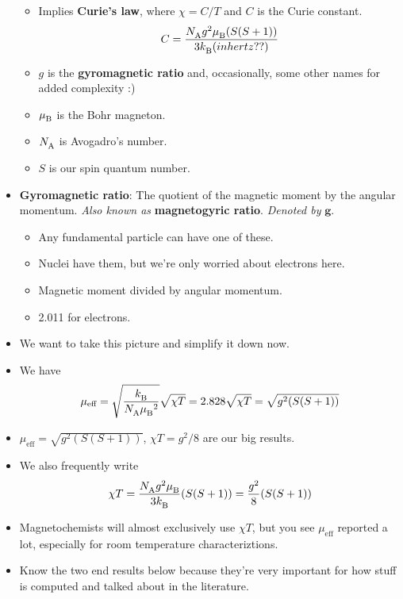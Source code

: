 \documentclass[../notes.tex]{subfiles}
\begin{document}
\begin{itemize}
\begin{itemize}
        \item Implies \textbf{Curie's law}, where $\chi=C/T$ and $C$ is the Curie constant.
        \begin{equation*}
            C = \frac{{N_\text{A}^{}} g^2{\mu_\text{B}^{}}(S(S+1))}{3{k_\text{B}^{}} (in hertz??)}
        \end{equation*}
        \item $g$ is the \textbf{gyromagnetic ratio} and, occasionally, some other names for added complexity :)
        \item ${\mu_\text{B}^{}}$ is the Bohr magneton.
        \item ${N_\text{A}^{}}$ is Avogadro's number.
        \item $S$ is our spin quantum number.
    \end{itemize}
    \item \textbf{Gyromagnetic ratio}: The quotient of the magnetic moment by the angular momentum. \emph{Also known as} \textbf{magnetogyric ratio}. \emph{Denoted by} $\bm{g}$.
    \begin{itemize}
        \item Any fundamental particle can have one of these.
        \item Nuclei have them, but we're only worried about electrons here.
        \item Magnetic moment divided by angular momentum.
        \item 2.011 for electrons.
    \end{itemize}
    \item We want to take this picture and simplify it down now.
    \item We have
    \begin{equation*}
        \mu_\text{eff} = \sqrt{\frac{{k_\text{B}^{}}}{{N_\text{A}^{}}{\mu_\text{B}^{}}^2}}\sqrt{\chi T}
        = 2.828\sqrt{\chi T}
        = \sqrt{g^2(S(S+1))}
    \end{equation*}
    \item $\mu_\text{eff}=\sqrt{g^2(S(S+1))}$, $\chi T=g^2/8$ are our big results.
    \item We also frequently write
    \begin{equation*}
        \chi T = \frac{{N_\text{A}^{}} g^2{\mu_\text{B}^{}}}{3{k_\text{B}^{}}}(S(S+1))
        = \frac{g^2}{8}(S(S+1))
    \end{equation*}
    \item Magnetochemists will almost exclusively use $\chi T$, but you see $\mu_\text{eff}$ reported a lot, especially for room temperature characteriztions.
    \item Know the two end results below because they're very important for how stuff is computed and talked about in the literature.

\end{itemize}
\end{document}
